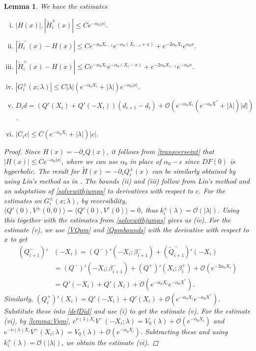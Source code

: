 \documentclass[12pt]{elsarticle}
\theoremstyle{plain}
\newtheorem{lemma}[theorem]{Lemma}
\theoremstyle{definition}
\theoremstyle{remark}
\numberwithin{theorem}{section}
\numberwithin{equation}{section}
\begin{document}
\begin{lemma}\label{stabestimateslemma}We have the estimates
\begin{enumerate}[(i)]
\item $|H(x)|, |\tilde{H}_i^\pm(x)| \leq C e^{-\alpha_0 |x|}$.
\item $|\tilde{H}_i^-(x) - H(x)| \leq C e^{-\alpha_0 X_{i-1}} e^{-\alpha_0(X_{i-1} + x) } + e^{-2 \alpha_0 X_i} e^{\alpha_0 x}$.
\item $|\tilde{H}_i^+(x) - H(x)| \leq C e^{-\alpha_0 X_i} e^{-\alpha_0(X_i - x) } + e^{-2 \alpha_0 X_{i-1}} e^{-\alpha_0 x}$.
\item $|G_i^\pm(x; \lambda)| \leq C |\lambda|(e^{-\alpha_0 X_i}+ |\lambda|) e^{-\alpha_0 |x|}$.
\item $D_i d = ( Q'(X_i) + Q'(-X_i))(d_{i+1} - d_i ) + \mathcal{O} ( e^{-\alpha_0 X_i} (e^{-\alpha_0 X^*} + |\lambda| )|d|)$.
\item $|C_i c| \leq C (e^{-\alpha_0 X_i} + |\lambda| ) |c|$.
\end{enumerate}
\begin{proof}
Since $H(x) = -\partial_c Q(x)$, it follows from \cref{transverseint} that $|H(x)| \leq C e^{-\alpha_0|x|}$, where we can use $\alpha_0$ in place of $\alpha_0 - \epsilon$ since $DF(0)$ is hyperbolic. The result for $\tilde{H}(x) = -\partial_c Q_i^\pm(x)$ can be similarly obtained by using Lin's method as in \cite{SandstedeStrut,Sandstede1993}. The bounds (ii) and (iii) follow from Lin's method and an adaptation of \cref{solvewithjumps} to derivatives with respect to $c$. For the estimates on $G_i^\pm(x; \lambda)$, by reversibility, $\langle Q'(0), V^\pm(0, 0) \rangle = \langle Q'(0), V^c(0) \rangle = 0$, thus $k_i^\pm(\lambda) = \mathcal{O}(|\lambda|)$. Using this together with the estimates from \cref{solvewithjumps} gives us (iv). For the estimate (v), we use \cref{VQpm} and \cref{Qpmbounds} with the derivative with respect to $x$ to get
\begin{align*}
(Q_{i+1}^-)'&(-X_i) = (Q^-)'(-X_i; \beta_{i+1}^-) + (\tilde{Q}_{i+1}^-)'(-X_i) \\
&= (Q^-)'(-X_i; \beta_{i+1}^-) + (Q^+)'(X_i; \beta_i^+) + \mathcal{O}(e^{-2 \alpha_0 X_i}) \\
&= Q'(-X_i) + Q'(X_i) + \mathcal{O}(e^{-\alpha_0 X_i}e^{-\alpha_0 X^*}).
\end{align*}
Similarly, $(Q_i^+)'(X_i) = Q'(-X_i) + Q'(X_i) + \mathcal{O}(e^{-\alpha_0 X_i}e^{-\alpha_0 X^*})$. Substitute these into \cref{defDid} and use (i) to get the estimate (v). For the estimate (vi), by \cref{lemma:Vpm}, $e^{\nu(\lambda) X_i} V^-(-X_i; \lambda) = V_0(\lambda) + \mathcal{O}(e^{-\alpha_0 X_i})$ and $e^{-\nu(\lambda) X_i} V^+(X_i; \lambda) = V_0(\lambda) + \mathcal{O}(e^{-\alpha_0 X_i})$. Subtracting these and using $k_i^\pm(\lambda) = \mathcal{O}(|\lambda|)$, we obtain the estimate (vi).
\end{proof}
\end{lemma}
\end{document}
